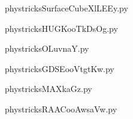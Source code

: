     \newcommand{\CaptionFigSurfaceCubeXlLEEy}{<+Type your caption here+>}
    \begin{center}
        
    \end{center}
    phystricksSurfaceCubeXlLEEy.py

    

    \clearpage
    


    \newcommand{\CaptionFigHUGKooTkDsOg}{<+Type your caption here+>}
    \begin{center}
        
    \end{center}
    phystricksHUGKooTkDsOg.py

    

    \clearpage
    


    \newcommand{\CaptionFigOLuvnaY}{<+Type your caption here+>}
    \begin{center}
        
    \end{center}
    phystricksOLuvnaY.py

    

    \clearpage
    


    \newcommand{\CaptionFigGDSEooVtgtKw}{<+Type your caption here+>}
    \begin{center}
        
    \end{center}
    phystricksGDSEooVtgtKw.py

    

    \clearpage
    


    \newcommand{\CaptionFigMAXkaGz}{<+Type your caption here+>}
    \begin{center}
        
    \end{center}
    phystricksMAXkaGz.py

    

    \clearpage
    


    \newcommand{\CaptionFigRAACooAwsaVw}{<+Type your caption here+>}
    \begin{center}
        
    \end{center}
    phystricksRAACooAwsaVw.py

